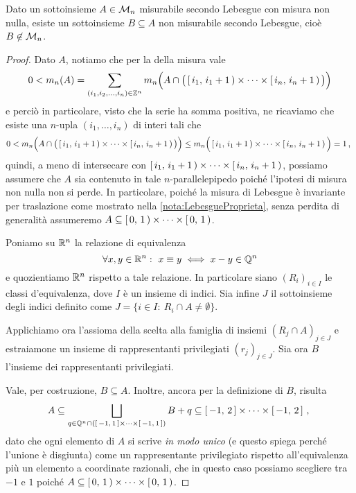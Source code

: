 \begin{theorem}\label{thm:InsiemeVitali}
	Dato un sottoinsieme $A\in\mathcal M_n$ misurabile secondo Lebesgue con misura non nulla, esiste un sottoinsieme $B\subseteq A$ non misurabile secondo Lebesgue, cioè $B\not\in\mathcal M_n$.
\end{theorem}
\begin{proof}
	Dato $A$, notiamo che per la \sigadd[ità] della misura vale
	\begin{equation*}
		0<m_n(A)=\sum_{(i_1,i_2,\dots,i_n)\in\mathbb Z^n} m_n\Big(A\cap\big(\left[\,i_1,\,i_1+1\,\right)\times\cdots\times\left[\,i_n,\,i_n+1\,\right)\big)\Big)
	\end{equation*}
	e perciò in particolare, visto che la serie ha somma positiva, ne ricaviamo che esiste una $n$-upla $(i_1,\dots,i_n)$ di interi tali che
	\begin{equation*}
		0<m_n\Big(A\cap\big(\left[\,i_1,\,i_1+1\,\right)\times\cdots\times\left[\,i_n,\,i_n+1\,\right)\big)\Big)\le
		m_n\Big(\left[\,i_1,\,i_1+1\,\right)\times\cdots\times\left[\,i_n,\,i_n+1\,\right)\Big)=1 \, \text{, }
	\end{equation*}
	quindi, a meno di intersecare con $\left[\,i_1,\,i_1+1\,\right)\times\cdots\times\left[\,i_n,\,i_n+1\,\right)$, possiamo assumere che $A$ sia contenuto in tale $n$-parallelepipedo poiché l'ipotesi di misura non nulla non si perde. 
	In particolare, poiché la misura di Lebesgue è invariante per traslazione come mostrato nella \cref{nota:LebesgueProprieta}, senza perdita di generalità assumeremo $A\subseteq \left[\,0,\,1\,\right)\times\cdots\times\left[\,0,\,1\,\right)$.
	
	Poniamo su $\mathbb R^n$ la relazione di equivalenza 
	\begin{equation*}
		\forall x,y\in\mathbb R^n:\ x\equiv y\iff x-y\in\mathbb Q^n
	\end{equation*}
	e quozientiamo $\mathbb R^n$ rispetto a tale relazione. In particolare siano $(R_i)_{i\in I}$ le classi d'equivalenza, dove $I$ è un insieme di indici. Sia infine $J$ il sottoinsieme degli indici definito come $J=\{i\in I:\ R_i\cap A\not =\emptyset\}$. 

	Applichiamo ora l'assioma della scelta alla famiglia di insiemi $(R_j\cap A)_{j\in J}$ e estraiamone un insieme di rappresentanti privilegiati $(r_j)_{j\in J}$. Sia ora $B$ l'insieme dei rappresentanti privilegiati.
	
	Vale, per costruzione, $B\subseteq A$. 
	Inoltre, ancora per la definizione di $B$, risulta
	\begin{equation}\label{eq:ContenimentiVitali}
		A\subseteq\bigsqcup_{q\in\mathbb Q^n\cap\left(\left[\,-1,\,1\,\right]\times\cdots \times\left[\,-1,\,1\,\right]\right)} B+q\subseteq \left[\,-1,\,2\,\right]\times\cdots\times\left[\,-1,\,2\,\right]\, \text{, }
	\end{equation}
	dato che ogni elemento di $A$ si scrive \emph{in modo unico} (e questo spiega perché l'unione è disgiunta) come un rappresentante privilegiato rispetto all'equivalenza più un elemento a coordinate razionali, che in questo caso possiamo scegliere tra $-1$ e $1$ poiché $A\subseteq \left[\,0,\,1\,\right)\times\cdots \times\left[\,0,\,1\,\right)$.
	

\end{proof}
